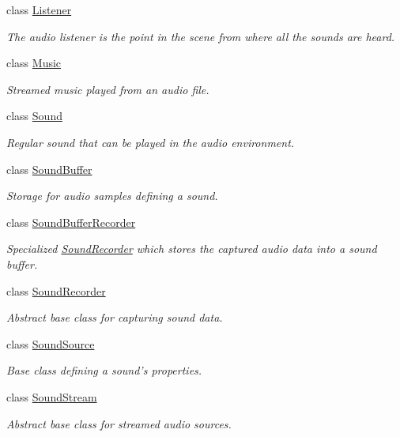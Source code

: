 \begin{DoxyCompactItemize}
\item 
class \hyperlink{classsf_1_1_listener}{Listener}
\begin{DoxyCompactList}\small\item\em The audio listener is the point in the scene from where all the sounds are heard. \end{DoxyCompactList}\item 
class \hyperlink{classsf_1_1_music}{Music}
\begin{DoxyCompactList}\small\item\em Streamed music played from an audio file. \end{DoxyCompactList}\item 
class \hyperlink{classsf_1_1_sound}{Sound}
\begin{DoxyCompactList}\small\item\em Regular sound that can be played in the audio environment. \end{DoxyCompactList}\item 
class \hyperlink{classsf_1_1_sound_buffer}{Sound\-Buffer}
\begin{DoxyCompactList}\small\item\em Storage for audio samples defining a sound. \end{DoxyCompactList}\item 
class \hyperlink{classsf_1_1_sound_buffer_recorder}{Sound\-Buffer\-Recorder}
\begin{DoxyCompactList}\small\item\em Specialized \hyperlink{classsf_1_1_sound_recorder}{Sound\-Recorder} which stores the captured audio data into a sound buffer. \end{DoxyCompactList}\item 
class \hyperlink{classsf_1_1_sound_recorder}{Sound\-Recorder}
\begin{DoxyCompactList}\small\item\em Abstract base class for capturing sound data. \end{DoxyCompactList}\item 
class \hyperlink{classsf_1_1_sound_source}{Sound\-Source}
\begin{DoxyCompactList}\small\item\em Base class defining a sound's properties. \end{DoxyCompactList}\item 
class \hyperlink{classsf_1_1_sound_stream}{Sound\-Stream}
\begin{DoxyCompactList}\small\item\em Abstract base class for streamed audio sources. \end{DoxyCompactList}\item 

\end{DoxyCompactItemize}
